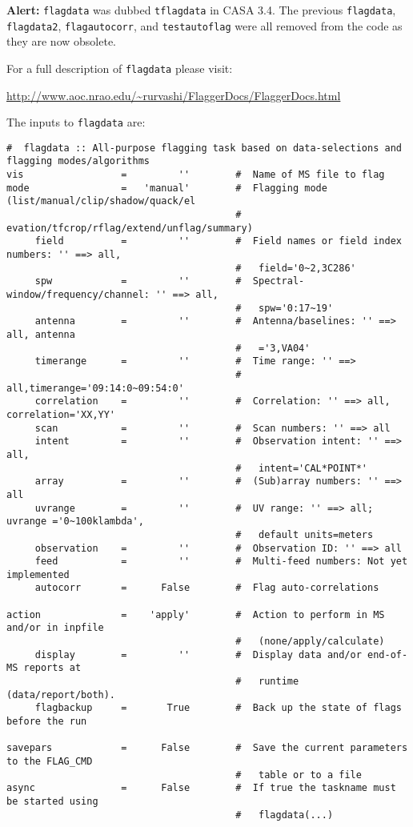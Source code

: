 {\bf Alert:} {\tt flagdata} was dubbed {\tt tflagdata} in CASA
3.4. The previous {\tt flagdata}, {\tt flagdata2},
{\tt flagautocorr}, and {\tt testautoflag} were all removed from the
code as they are now obsolete.

For a full description of {\tt flagdata} please visit:

\url{http://www.aoc.nrao.edu/\~rurvashi/FlaggerDocs/FlaggerDocs.html}

The inputs to {\tt flagdata} are:

\small
\begin{verbatim}
#  flagdata :: All-purpose flagging task based on data-selections and flagging modes/algorithms
vis                 =         ''        #  Name of MS file to flag
mode                =   'manual'        #  Flagging mode (list/manual/clip/shadow/quack/el
                                        #   evation/tfcrop/rflag/extend/unflag/summary)
     field          =         ''        #  Field names or field index numbers: '' ==> all,
                                        #   field='0~2,3C286'
     spw            =         ''        #  Spectral-window/frequency/channel: '' ==> all,
                                        #   spw='0:17~19'
     antenna        =         ''        #  Antenna/baselines: '' ==> all, antenna
                                        #   ='3,VA04'
     timerange      =         ''        #  Time range: '' ==>
                                        #   all,timerange='09:14:0~09:54:0'
     correlation    =         ''        #  Correlation: '' ==> all, correlation='XX,YY'
     scan           =         ''        #  Scan numbers: '' ==> all
     intent         =         ''        #  Observation intent: '' ==> all,
                                        #   intent='CAL*POINT*'
     array          =         ''        #  (Sub)array numbers: '' ==> all
     uvrange        =         ''        #  UV range: '' ==> all; uvrange ='0~100klambda',
                                        #   default units=meters
     observation    =         ''        #  Observation ID: '' ==> all
     feed           =         ''        #  Multi-feed numbers: Not yet implemented
     autocorr       =      False        #  Flag auto-correlations

action              =    'apply'        #  Action to perform in MS and/or in inpfile
                                        #   (none/apply/calculate)
     display        =         ''        #  Display data and/or end-of-MS reports at
                                        #   runtime (data/report/both).
     flagbackup     =       True        #  Back up the state of flags before the run

savepars            =      False        #  Save the current parameters to the FLAG_CMD
                                        #   table or to a file
async               =      False        #  If true the taskname must be started using
                                        #   flagdata(...)

\end{verbatim}
\normalsize


